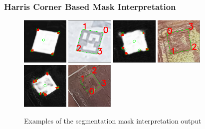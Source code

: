 \documentclass[10pt]{book}
\begin{document}
\subsubsection{Harris Corner Based Mask Interpretation}

\begin{figure}
  \centering
     {\includegraphics[width=0.2\textwidth]{image/segpet_mask_8_pred_corners}}
     {\includegraphics[width=0.2\textwidth]{image/segpet_mask_8_pred_rect}}
     {\includegraphics[width=0.2\textwidth]{image/segpet_mask_10_pred_corners}}
     {\includegraphics[width=0.2\textwidth]{image/segpet_mask_10_pred_rect}}
     {\includegraphics[width=0.2\textwidth]{image/segpet_mask_6_pred_corners}}
     {\includegraphics[width=0.2\textwidth]{image/segpet_mask_6_pred_rect}}
  \caption{Examples of the segmentation mask interpretation output}
  \label{fig:segpet_rect_interp}
\end{figure}
\end{document}
